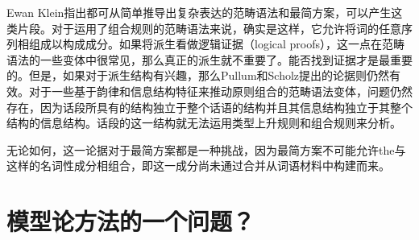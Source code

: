 Ewan Klein指出都可从简单推导出复杂表达的范畴语法\indexcgc 和最简方案，可以产生这类片段\citep[]{Pullum2013a}。对于运用了组合规则的范畴语法来说，确实是这样，它允许将词的任意序列相组成以构成成分。如果将派生看做逻辑证据（logical proofs），这一点在范畴语法的一些变体中很常见，那么真正的派生就不重要了。能否找到证据才是最重要的。但是，如果对于派生结构有兴趣，那么Pullum和Scholz提出的论据则仍然有效。对于一些基于韵律和信息结构特征来推动原则组合的范畴语法变体\citep[\S~3]{Steedman91a}，问题仍然存在，因为话段所具有的结构独立于整个话语的结构并且其信息结构独立于其整个结构的信息结构。话段的这一结构就无法运用类型上升规则和组合规则来分析。

无论如何，这一论据对于最简方案都是一种挑战，因为最简方案不可能允许the与这样的名词性成分相组合，即这一成分尚未通过合并从词语材料中构建而来。

\section{模型论方法的一个问题？}
\label{Abschnitt-MTS-ten-Hacken}


